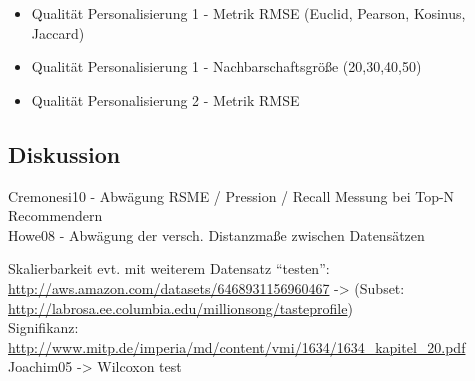 \begin{itemize}
\item Qualität Personalisierung 1 - Metrik RMSE (Euclid, Pearson, Kosinus, Jaccard)
\item Qualität Personalisierung 1 - Nachbarschaftsgröße (20,30,40,50)
\item Qualität Personalisierung 2 - Metrik RMSE
\end{itemize}

\subsection{Diskussion}

Cremonesi10 - Abwägung RSME / Pression / Recall Messung bei Top-N Recommendern \\
Howe08 - Abwägung der versch. Distanzmaße zwischen Datensätzen

Skalierbarkeit evt. mit weiterem Datensatz ``testen'': \\
\url{http://aws.amazon.com/datasets/6468931156960467} -> (Subset: \url{http://labrosa.ee.columbia.edu/millionsong/tasteprofile}) \\

Signifikanz: \url{http://www.mitp.de/imperia/md/content/vmi/1634/1634_kapitel_20.pdf} \\
Joachim05 -> Wilcoxon test